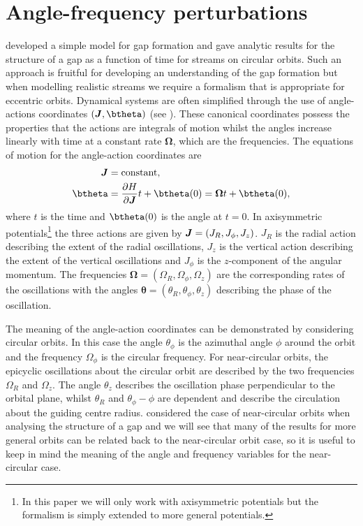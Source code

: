 \documentclass[useAMS,usenatbib,fleqn,a4paper]{mn2e}
\newcommand{\bs}[1]{\bmath{#1}}
\begin{document}
\section{Angle-frequency perturbations}\label{Sec::Formalism_angfreq}
\cite{ErkalBelokurov2015} developed a simple model for gap formation and gave analytic results for the structure of a gap as a function of time for streams on circular orbits. Such an approach is fruitful for developing an understanding of the gap formation but when modelling realistic streams we require a formalism that is appropriate for eccentric orbits. Dynamical systems are often simplified through the use of angle-actions coordinates $(\bs{J},\btheta)$ (see \citealt{BinneyTremaine}). These canonical coordinates possess the properties that the actions are integrals of motion whilst the angles increase linearly with time at a constant rate $\boldsymbol{\Omega}$, which are the frequencies. The equations of motion for the angle-action coordinates are
\begin{equation}
\begin{split}
\bs{J}&=\mathrm{constant},\\
\btheta&=\frac{\partial H}{\partial\boldsymbol{J}}t+\btheta(0)=\boldsymbol{\Omega}t+\btheta(0),
\end{split}
\end{equation}
where $t$ is the time and $\btheta(0)$ is the angle at $t=0$. In axisymmetric potentials\footnote{In this paper we will only work with axisymmetric potentials but the formalism is simply extended to more general potentials.} the three actions are given by $\bs{J}=(J_R,J_\phi,J_z)$. $J_R$ is the radial action describing the extent of the radial oscillations, $J_z$ is the vertical action describing the extent of the vertical oscillations and $J_\phi$ is the $z$-component of the angular momentum. The frequencies $\boldsymbol{\Omega}=(\Omega_R,\Omega_\phi,\Omega_z)$  are the corresponding rates of the oscillations with the angles $\boldsymbol{\theta}=(\theta_R,\theta_\phi,\theta_z)$ describing the phase of the oscillation.

The meaning of the angle-action coordinates can be demonstrated by considering circular orbits. In this case the angle $\theta_\phi$ is the azimuthal angle $\phi$ around the orbit and the frequency $\Omega_\phi$ is the circular frequency. For near-circular orbits, the epicyclic oscillations about the circular orbit are described by the two frequencies $\Omega_R$ and $\Omega_z$. The angle $\theta_z$ describes the oscillation phase perpendicular to the orbital plane, whilst $\theta_R$ and $\theta_\phi-\phi$ are dependent and describe the circulation about the guiding centre radius. \cite{ErkalBelokurov2015} considered the case of near-circular orbits when analysing the structure of a gap and we will see that many of the results for more general orbits can be related back to the near-circular orbit case, so it is useful to keep in mind the meaning of the angle and frequency variables for the near-circular case.
\end{document}
